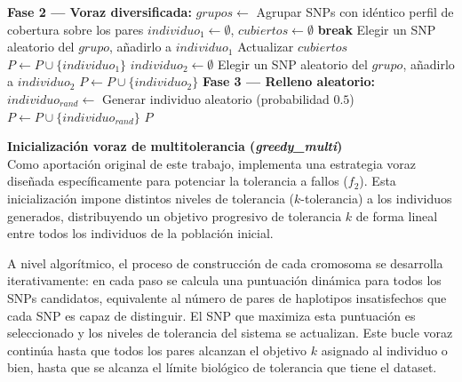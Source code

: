 \addtocounter{algorithm}{-1}
\begin{algorithm}[H]
\caption{Inicialización híbrida de Ting (\textit{greedy\_ting}) (Parte 2)}
\begin{algorithmic}[1]
\State \textbf{Fase 2 --- Voraz diversificada:}
\State $grupos \gets$ Agrupar SNPs con idéntico perfil de cobertura sobre los pares 
 
    \State $individuo_1 \gets \emptyset$, $cubiertos \gets \emptyset$ 
         \textbf{break} \EndIf
        \State Elegir un SNP aleatorio del $grupo$, añadirlo a $individuo_1$
        \State Actualizar $cubiertos$
    \EndFor
    \State $P \gets P \cup \{individuo_1\}$
     
        \State $individuo_2 \gets \emptyset$ 
            \State Elegir un SNP aleatorio del $grupo$, añadirlo a $individuo_2$
        \EndFor
        \State $P \gets P \cup \{individuo_2\}$
    \EndIf
\EndWhile
\State 
\State \textbf{Fase 3 --- Relleno aleatorio:}
 
    \State $individuo_{rand} \gets$ Generar individuo aleatorio (probabilidad $0.5$)
    \State $P \gets P \cup \{individuo_{rand}\}$
\EndWhile
\State \Return $P$
\end{algorithmic}
\end{algorithm}


\textbf{Inicialización voraz de multitolerancia (\textit{greedy\_multi})} \\
Como aportación original de este trabajo, implementa una estrategia voraz diseñada específicamente para potenciar la tolerancia a fallos ($f_2$). Esta inicialización impone distintos niveles de tolerancia ($k$-tolerancia) a los individuos generados, distribuyendo un objetivo progresivo de tolerancia $k$ de forma lineal entre todos los individuos de la población inicial. 

A nivel algorítmico, el proceso de construcción de cada cromosoma se desarrolla iterativamente: en cada paso se calcula una puntuación dinámica para todos los SNPs candidatos, equivalente al número de pares de haplotipos insatisfechos que cada SNP es capaz de distinguir. El SNP que maximiza esta puntuación es seleccionado y los niveles de tolerancia del sistema se actualizan. Este bucle voraz continúa hasta que todos los pares alcanzan el objetivo $k$ asignado al individuo o bien, hasta que se alcanza el límite biológico de tolerancia que tiene el dataset. 

